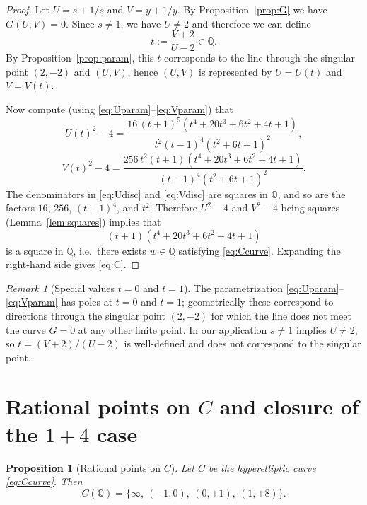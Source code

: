 \documentclass[12pt]{article}
\newtheorem{proposition}{Proposition}
\theoremstyle{remark}
\newtheorem{remark}{Remark}
\theoremstyle{definition}
\begin{document}
\begin{proof}
Let $U=s+1/s$ and $V=y+1/y$.
By Proposition~\ref{prop:G} we have $G(U,V)=0$.
Since $s\neq 1$, we have $U\neq 2$ and therefore we can define
\[
t:=\frac{V+2}{U-2}\in\mathbb{Q}.
\]
By Proposition~\ref{prop:param}, this $t$ corresponds to the line through the singular point $(2,-2)$ and $(U,V)$, hence $(U,V)$ is represented by $U=U(t)$ and $V=V(t)$.

Now compute (using \eqref{eq:Uparam}--\eqref{eq:Vparam}) that
\begin{equation}\label{eq:Udisc}
U(t)^{2}-4=\frac{16\,(t+1)^{5}(t^{4}+20t^{3}+6t^{2}+4t+1)}{t^{2}(t-1)^{4}(t^{2}+6t+1)^{2}},
\end{equation}
\begin{equation}\label{eq:Vdisc}
V(t)^{2}-4=\frac{256\,t^{2}(t+1)(t^{4}+20t^{3}+6t^{2}+4t+1)}{(t-1)^{4}(t^{2}+6t+1)^{2}}.
\end{equation}
The denominators in \eqref{eq:Udisc} and \eqref{eq:Vdisc} are squares in $\mathbb{Q}$, and so are the factors $16$, $256$, $(t+1)^4$, and $t^2$.
Therefore $U^{2}-4$ and $V^{2}-4$ being squares (Lemma~\ref{lem:squares}) implies that
\[
(t+1)(t^{4}+20t^{3}+6t^{2}+4t+1)
\]
is a square in $\mathbb{Q}$, i.e.\ there exists $w\in\mathbb{Q}$ satisfying \eqref{eq:Ccurve}.
Expanding the right-hand side gives \eqref{eq:C}.
\end{proof}

\begin{remark}[Special values $t=0$ and $t=1$]
The parametrization \eqref{eq:Uparam}--\eqref{eq:Vparam} has poles at $t=0$ and $t=1$; geometrically these correspond to directions through the singular point $(2,-2)$ for which the line does not meet the curve $G=0$ at any other finite point.
In our application $s\neq 1$ implies $U\neq 2$, so $t=(V+2)/(U-2)$ is well-defined and does not correspond to the singular point.
\end{remark}


\section{Rational points on \texorpdfstring{$C$}{C} and closure of the \texorpdfstring{$1+4$}{1+4} case}\label{sec:points}

\begin{proposition}[Rational points on $C$]\label{prop:CQ}
Let $C$ be the hyperelliptic curve \eqref{eq:Ccurve}.
Then
\[
C(\mathbb{Q})=\bigl\{\infty,\ (-1,0),\ (0,\pm 1),\ (1,\pm 8)\bigr\}.
\]
\end{proposition}
\end{document}

